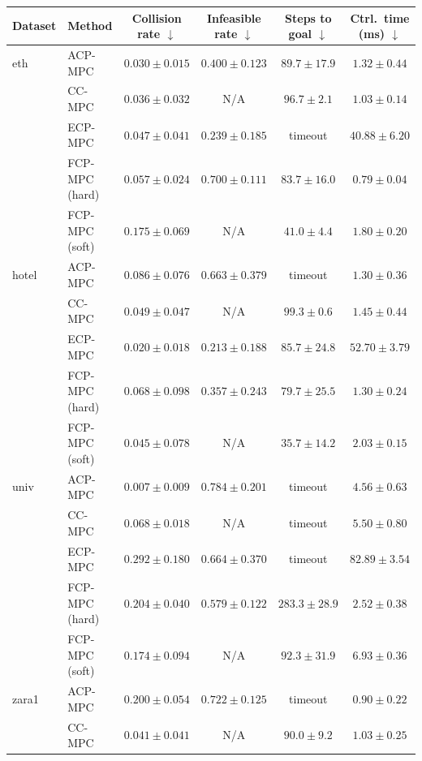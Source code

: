 \begin{tabular}{llcccc}
\hline
Dataset & Method & Collision rate $\downarrow$ & Infeasible rate $\downarrow$ & Steps to goal $\downarrow$ & Ctrl.\ time (ms) $\downarrow$ \\
\hline
eth & ACP-MPC~\cite{dixit2023adaptive} & $\mathbf{0.030}\pm0.015$ & $0.400\pm0.123$ & $89.7\pm17.9$ & $1.32\pm0.44$ \\
 & CC-MPC~\cite{lekeufack2024decision} & $0.036\pm0.032$ & N/A & $96.7\pm2.1$ & $1.03\pm0.14$ \\
 & ECP-MPC~\cite{shin2025egocentric} & $0.047\pm0.041$ & $\mathbf{0.239}\pm0.185$ & timeout & $40.88\pm6.20$ \\
 & FCP-MPC (hard) & $0.057\pm0.024$ & $0.700\pm0.111$ & $83.7\pm16.0$ & $\mathbf{0.79}\pm0.04$ \\
 & FCP-MPC (soft) & $0.175\pm0.069$ & N/A & $\mathbf{41.0}\pm4.4$ & $1.80\pm0.20$ \\
\hline
hotel & ACP-MPC~\cite{dixit2023adaptive} & $0.086\pm0.076$ & $0.663\pm0.379$ & timeout & $1.30\pm0.36$ \\
 & CC-MPC~\cite{lekeufack2024decision} & $0.049\pm0.047$ & N/A & $99.3\pm0.6$ & $1.45\pm0.44$ \\
 & ECP-MPC~\cite{shin2025egocentric} & $\mathbf{0.020}\pm0.018$ & $\mathbf{0.213}\pm0.188$ & $85.7\pm24.8$ & $52.70\pm3.79$ \\
 & FCP-MPC (hard) & $0.068\pm0.098$ & $0.357\pm0.243$ & $79.7\pm25.5$ & $\mathbf{1.30}\pm0.24$ \\
 & FCP-MPC (soft) & $0.045\pm0.078$ & N/A & $\mathbf{35.7}\pm14.2$ & $2.03\pm0.15$ \\
\hline
univ & ACP-MPC~\cite{dixit2023adaptive} & $\mathbf{0.007}\pm0.009$ & $0.784\pm0.201$ & timeout & $4.56\pm0.63$ \\
 & CC-MPC~\cite{lekeufack2024decision} & $0.068\pm0.018$ & N/A & timeout & $5.50\pm0.80$ \\
 & ECP-MPC~\cite{shin2025egocentric} & $0.292\pm0.180$ & $0.664\pm0.370$ & timeout & $82.89\pm3.54$ \\
 & FCP-MPC (hard) & $0.204\pm0.040$ & $\mathbf{0.579}\pm0.122$ & $283.3\pm28.9$ & $\mathbf{2.52}\pm0.38$ \\
 & FCP-MPC (soft) & $0.174\pm0.094$ & N/A & $\mathbf{92.3}\pm31.9$ & $6.93\pm0.36$ \\
\hline
zara1 & ACP-MPC~\cite{dixit2023adaptive} & $0.200\pm0.054$ & $0.722\pm0.125$ & timeout & $0.90\pm0.22$ \\
 & CC-MPC~\cite{lekeufack2024decision} & $\mathbf{0.041}\pm0.041$ & N/A & $90.0\pm9.2$ & $1.03\pm0.25$ \\

\end{tabular}

